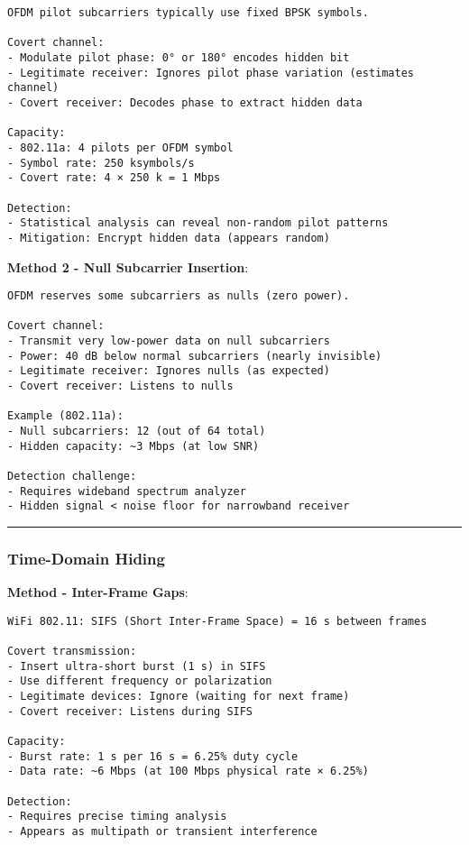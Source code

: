 \begin{verbatim}
OFDM pilot subcarriers typically use fixed BPSK symbols.

Covert channel:
- Modulate pilot phase: 0° or 180° encodes hidden bit
- Legitimate receiver: Ignores pilot phase variation (estimates channel)
- Covert receiver: Decodes phase to extract hidden data

Capacity:
- 802.11a: 4 pilots per OFDM symbol
- Symbol rate: 250 ksymbols/s
- Covert rate: 4 × 250 k = 1 Mbps

Detection:
- Statistical analysis can reveal non-random pilot patterns
- Mitigation: Encrypt hidden data (appears random)
\end{verbatim}

\textbf{Method 2 - Null Subcarrier Insertion}:

\begin{verbatim}
OFDM reserves some subcarriers as nulls (zero power).

Covert channel:
- Transmit very low-power data on null subcarriers
- Power: 40 dB below normal subcarriers (nearly invisible)
- Legitimate receiver: Ignores nulls (as expected)
- Covert receiver: Listens to nulls

Example (802.11a):
- Null subcarriers: 12 (out of 64 total)
- Hidden capacity: ~3 Mbps (at low SNR)

Detection challenge:
- Requires wideband spectrum analyzer
- Hidden signal < noise floor for narrowband receiver
\end{verbatim}

\begin{center}\rule{0.5\linewidth}{0.5pt}\end{center}

\subsubsection{Time-Domain Hiding}\label{time-domain-hiding}

\textbf{Method - Inter-Frame Gaps}:

\begin{verbatim}
WiFi 802.11: SIFS (Short Inter-Frame Space) = 16 s between frames

Covert transmission:
- Insert ultra-short burst (1 s) in SIFS
- Use different frequency or polarization
- Legitimate devices: Ignore (waiting for next frame)
- Covert receiver: Listens during SIFS

Capacity:
- Burst rate: 1 s per 16 s = 6.25% duty cycle
- Data rate: ~6 Mbps (at 100 Mbps physical rate × 6.25%)

Detection:
- Requires precise timing analysis
- Appears as multipath or transient interference
\end{verbatim}

